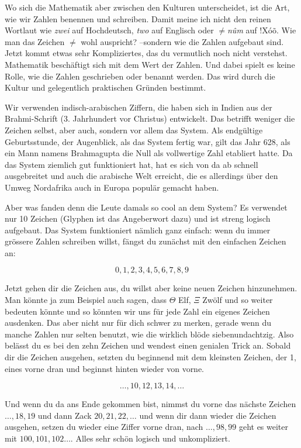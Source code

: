 Wo sich die Mathematik aber zwischen den Kulturen unterscheidet, ist die Art, wie wir Zahlen benennen und schreiben. Damit meine ich nicht den reinen Wortlaut wie \textit{zwei} auf Hochdeutsch, \textit{two} auf Englisch oder \textit{$\neq$n\^{u}m} auf $!$X\'{o}\~{o}. Wie man das Zeichen $\neq$ wohl auspricht? --sondern wie die Zahlen aufgebaut sind. Jetzt kommt etwas sehr Kompliziertes, das du vermutlich noch nicht verstehst. Mathematik beschäftigt sich mit dem Wert der Zahlen. Und dabei spielt es keine Rolle, wie die Zahlen geschrieben oder benannt werden. Das wird durch die Kultur und gelegentlich praktischen Gründen bestimmt.
%
 
%
Wir verwenden indisch-arabischen Ziffern, die haben sich in Indien aus der Brahmi-Schrift (3. Jahrhundert vor Christus) entwickelt. Das betrifft weniger die Zeichen selbst, aber auch, sondern vor allem das System. Als endgültige Geburtsstunde, der Augenblick, als das System fertig war, gilt das Jahr 628, als ein Mann namens Brahmagupta die Null als vollwertige Zahl etabliert hatte. Da das System ziemlich gut funktioniert hat, hat es sich von da ab schnell ausgebreitet und auch die arabische Welt erreicht, die es allerdings über den Umweg Nordafrika auch in Europa populär gemacht haben.

Aber was fanden denn die Leute damals so cool an dem System? Es verwendet nur 10 Zeichen (Glyphen ist das Angeberwort dazu) und ist streng logisch aufgebaut. Das System funktioniert nämlich ganz einfach: wenn du immer grössere Zahlen schreiben willst, fängst du zunächst mit den einfachen Zeichen an:

$$0, 1, 2, 3, 4, 5, 6, 7, 8, 9$$

Jetzt gehen dir die Zeichen aus, du willst aber keine neuen Zeichen hinzunehmen. Man könnte ja zum Beispiel auch sagen, dass $\Theta$ Elf, $\Xi$ Zwölf und so weiter bedeuten könnte und so könnten wir uns für jede Zahl ein eigenes Zeichen ausdenken. Das aber nicht nur für dich schwer zu merken, gerade wenn du manche Zahlen nur selten benutzt, wie die wirklich blöde siebenundachtzig. Also belässt du es bei den zehn Zeichen und wendest einen genialen Trick an. Sobald dir die Zeichen ausgehen, setzten du beginnend mit dem kleinsten Zeichen, der 1, eines vorne dran und beginnst hinten wieder von vorne.

$$\dots, 10, 12, 13, 14,\dots$$

Und wenn du da ans Ende gekommen bist, nimmst du vorne das nächste Zeichen $\dots, 18, 19$ und dann Zack $20, 21, 22,\dots$ und wenn dir dann wieder die Zeichen ausgehen, setzen du wieder eine Ziffer vorne dran, nach $\dots, 98, 99$ geht es weiter mit $100, 101,102\dots$. Alles sehr schön logisch und unkompliziert.

